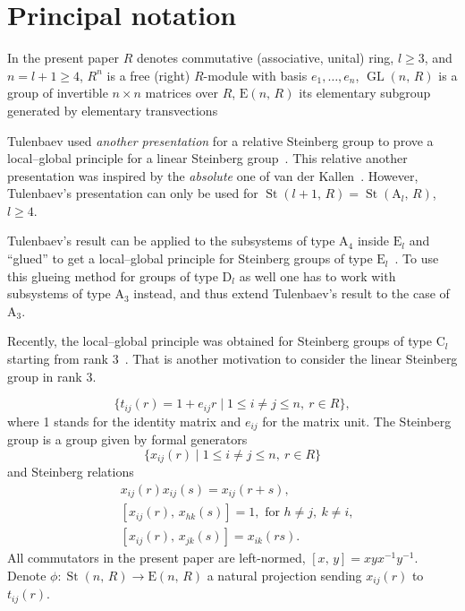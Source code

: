 \documentclass[11pt]{amsart}
\theoremstyle{plain} \declaretheorem[name=Theorem, Refname={Theorem,Theorems}]{tm} \Crefname{tm}{Theorem}{Theorems}
\numberwithin{equation}{section}
\theoremstyle{definition} \newtheorem{df}[lm]{Definition} \Crefname{df}{Definition}{Definitions}
\theoremstyle{remark} \newtheorem{rk}[lm]{Remark} \Crefname{rk}{Remark}{Remarks}
\newcommand{\E}{{\mathrm{E}}}
\newcommand{\St}{\mathop{\mathrm{St}}\nolimits}
\newcommand{\GL}{\mathop{\mathrm{GL}}\nolimits}
\newcommand{\inv}{^{-1}}
\begin{document}
\section{Principal notation}
In the present paper $R$ denotes commutative (associative, unital) ring, $l\geq3$, and $n=l+1\geq4$, $R^n$ is a free (right) $R$-module with basis $e_1,\ldots,e_n$, 
$\GL(n,\,R)$ is a group of invertible $n\times n$ matrices over $R$, $\E(n,\,R)$ its elementary subgroup generated by elementary transvections 

Tulenbaev used {\it another presentation} for a relative Steinberg group to prove a local--global principle for a linear Steinberg group~\cite{Tul}. 
This relative another presentation was inspired by the {\it absolute} one of van der Kallen~\cite{vdK}. 
However, Tulenbaev's presentation can only be used for $\St(l+1,\,R)=\St(\mathrm A_l,\,R)$, $l\geq4$.

Tulenbaev's result can be applied to the subsystems of type $\mathrm A_4$ inside $\mathrm E_l$ and ``glued'' to get a local--global principle for Steinberg groups of type $\mathrm E_l$~\cite{SCh}. 
To use this glueing method for groups of type $\mathrm D_l$ as well one has to work with subsystems of type $\mathrm A_3$ instead, and thus extend Tulenbaev's result to the case of $\mathrm A_3$.

Recently, the local--global principle was obtained for Steinberg groups of type $\mathrm C_l$ starting from rank 3~\cite{Lav2}. 
That is another motivation to consider the linear Steinberg group in rank 3.

$$\{t_{ij}(r)=1+e_{ij}r\mid1\leq i\neq j\leq n,\ r\in R\},$$
where 1 stands for the identity matrix and $e_{ij}$ for the matrix unit. The Steinberg group is a group given by formal generators
$$\{x_{ij}(r)\mid1\leq i\neq j\leq n,\ r\in R\}$$
and Steinberg relations
\setcounter{equation}{0}
\renewcommand{\theequation}{S\arabic{equation}}
\begin{align}
&x_{ij}(r)x_{ij}(s)=x_{ij}(r+s),\\
&[x_{ij}(r),\,x_{hk}(s)]=1,\text{ for }h\neq j,\ k\neq i,\\
&[x_{ij}(r),\,x_{jk}(s)]=x_{ik}(rs).
\end{align}
All commutators in the present paper are left-normed, $[x,\,y]=xyx\inv y\inv$. 
Denote $\phi\colon\St(n,\,R)\rightarrow\E(n,\,R)$ a natural projection sending $x_{ij}(r)$ to $t_{ij}(r)$.
\end{document}
